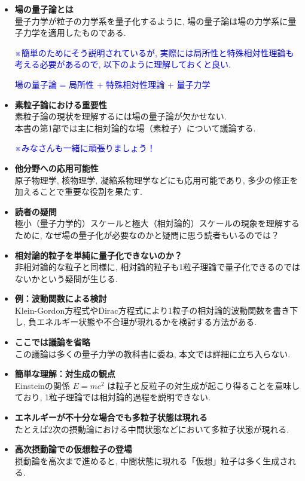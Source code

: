 \documentclass[a4paper,12pt]{article}
\begin{document}
\begin{itemize}
    \item \textbf{場の量子論とは} \\
    量子力学が粒子の力学系を量子化するように, 場の量子論は場の力学系に量子力学を適用したものである. \par
    \textcolor{blue}{※簡単のためにそう説明されているが, 実際には局所性と特殊相対性理論も考える必要があるので, 以下のように理解しておくと良い. 
    \begin{center}
        場の量子論 = 局所性 + 特殊相対性理論 + 量子力学
    \end{center}}
  
    \item \textbf{素粒子論における重要性} \\
    素粒子論の現状を理解するには場の量子論が欠かせない. \\
    本書の第1部では主に相対論的な場（素粒子）について議論する.\par
    \textcolor{blue}{※みなさんも一緒に頑張りましょう！}
  
    \item \textbf{他分野への応用可能性} \\
    原子物理学, 核物理学, 凝縮系物理学などにも応用可能であり, 多少の修正を加えることで重要な役割を果たす.
  
    \item \textbf{読者の疑問} \\
    極小（量子力学的）スケールと極大（相対論的）スケールの現象を理解するために, なぜ場の量子化が必要なのかと疑問に思う読者もいるのでは？
  
    \item \textbf{相対論的粒子を単純に量子化できないのか？} \\
    非相対論的な粒子と同様に, 相対論的粒子も1粒子理論で量子化できるのではないかという疑問が生じる.
  
    \item \textbf{例：波動関数による検討} \\
    Klein-Gordon方程式やDirac方程式により1粒子の相対論的波動関数を書き下し, 負エネルギー状態や不合理が現れるかを検討する方法がある.
  
    \item \textbf{ここでは議論を省略} \\
    この議論は多くの量子力学の教科書に委ね, 本文では詳細に立ち入らない.
  
    \item \textbf{簡単な理解：対生成の観点} \\
    Einsteinの関係 $E = mc^2$ は粒子と反粒子の対生成が起こり得ることを意味しており, 1粒子理論では相対論的過程を説明できない.
  
    \item \textbf{エネルギーが不十分な場合でも多粒子状態は現れる} \\
    たとえば2次の摂動論における中間状態などにおいて多粒子状態が現れる.
  
    \item \textbf{高次摂動論での仮想粒子の登場} \\
    摂動論を高次まで進めると, 中間状態に現れる「仮想」粒子は多く生成される.
\end{itemize}
  
\end{document}
